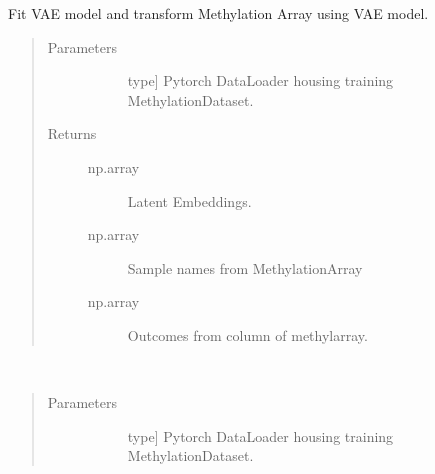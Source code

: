 \documentclass[letterpaper,10pt,english]{sphinxmanual}
\begin{document}
\begin{fulllineitems}
\begin{fulllineitems}
\begin{quote}
\begin{description}
\end{description}\end{quote}

\end{fulllineitems}


\begin{fulllineitems}
\label{\detokenize{index:methylnet.models.AutoEncoder.fit_transform}}
Fit VAE model and transform Methylation Array using VAE model.
\begin{quote}\begin{description}
\item[{Parameters}] \leavevmode\begin{description}
\item[{}] \leavevmode{[}type{]}
Pytorch DataLoader housing training MethylationDataset.

\end{description}

\item[{Returns}] \leavevmode\begin{description}
\item[{np.array}] \leavevmode
Latent Embeddings.

\item[{np.array}] \leavevmode
Sample names from MethylationArray

\item[{np.array}] \leavevmode
Outcomes from column of methylarray.

\end{description}

\end{description}\end{quote}

\end{fulllineitems}


\begin{fulllineitems}
\label{\detokenize{index:methylnet.models.AutoEncoder.transform}}~\begin{quote}\begin{description}
\item[{Parameters}] \leavevmode\begin{description}
\item[{}] \leavevmode{[}type{]}
Pytorch DataLoader housing training MethylationDataset.


\end{description}
\end{description}
\end{quote}
\end{fulllineitems}
\end{fulllineitems}
\end{document}
